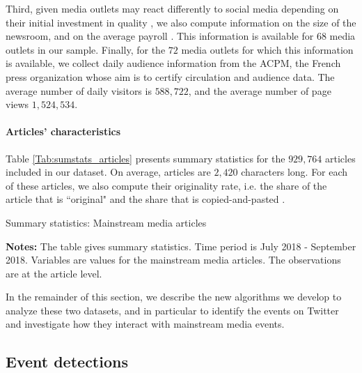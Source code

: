 Third, given media outlets may react differently to social media depending on their initial investment in quality \citep[see e.g.][]{deCorniereSarvary2019}, we also compute information on the size of the newsroom, and on the average payroll \citep{Cage2015_journalists}. This information is available for $68$ media outlets in our sample. Finally, for the $72$ media outlets for which this information is available, we collect daily audience information from the ACPM, the French press organization whose aim is to certify circulation and audience data. The average number of daily visitors is $588,722$, and the average number of page views $1,524,534$.


\paragraph{Articles' characteristics}

Table \ref{Tab:sumstats_articles} presents summary statistics for the $929,764$ articles included in our dataset. On average, articles are $2,420$ characters long. For each of these articles, we also compute their originality rate, i.e. the share of the article that is ``original" and the share that is copied-and-pasted \citep{CageHerveViaud2020}.


\begin{table}
\caption{Summary statistics: Mainstream media articles}
\begin{center}
	
\end{center}
\begin{spacing}{0.5}
	{\fns \textbf{Notes:} The table gives summary statistics. Time period is July 2018 - September 2018. Variables are values for the mainstream media articles. The observations are at the article level.} 
\end{spacing}
\label{Tab:sumstats_articles}
\end{table} 



\medskip
In the remainder of this section, we describe the new algorithms we develop to analyze these two datasets, and in particular to identify the events on Twitter and investigate how they interact with mainstream media events.



\subsection{Event detections}

